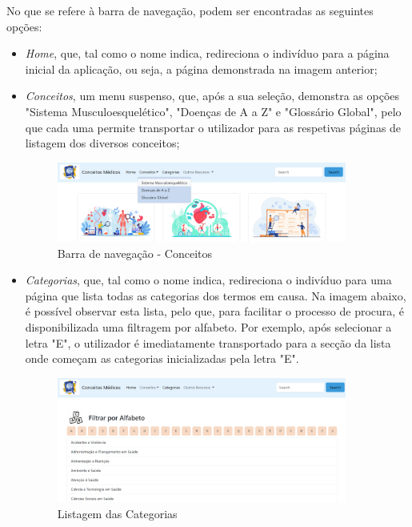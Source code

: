 No que se refere à barra de navegação, podem ser encontradas as seguintes opções:

\begin{itemize}
    \item \textit{Home}, que, tal como o nome indica, redireciona o indivíduo para a página inicial da aplicação, ou seja, a página demonstrada na imagem anterior;

    \item \textit{Conceitos}, um menu suspenso, que, após a sua seleção, demonstra as opções "Sistema Musculoesquelético", "Doenças de A a Z" e "Glossário Global", pelo que cada uma permite transportar o utilizador para as respetivas páginas de listagem dos diversos conceitos;

    \begin{figure}[H]
        \centering
        \centering
        \includegraphics[width=0.9\textwidth]{Images/navbar_conceitos.png}
        \caption{Barra de navegação - Conceitos}
        \label{fig:dic-traduc1}
    \end{figure}

    \item \textit{Categorias}, que, tal como o nome indica, redireciona o indivíduo para uma página que lista todas as categorias dos termos em causa. Na imagem abaixo, é possível observar esta lista, pelo que, para facilitar o processo de procura, é disponibilizada uma filtragem por alfabeto. Por exemplo, após selecionar a letra "E", o utilizador é imediatamente transportado para a secção da lista onde começam as categorias inicializadas pela letra "E".

    \begin{figure}[H]
        \centering
        \centering
        \includegraphics[width=0.9\textwidth]{Images/navbar_categorias.png}
        \caption{Listagem das Categorias}
        \label{fig:dic-traduc1}
    \end{figure}


\end{itemize}
